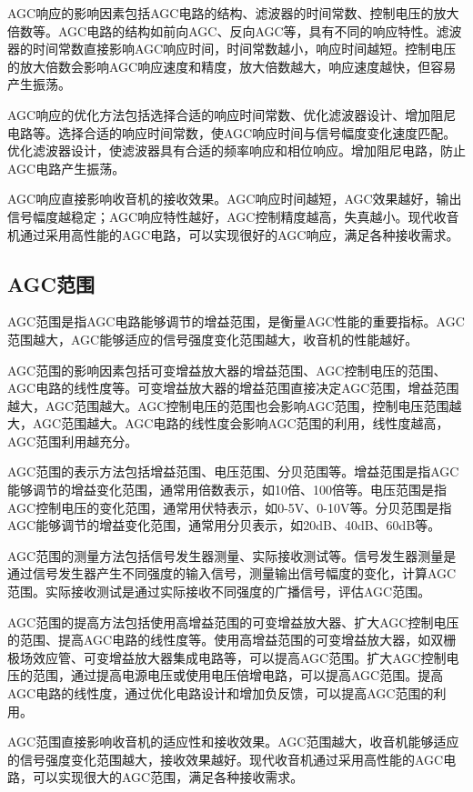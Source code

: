 \documentclass[12pt,UTF8]{ctexbook}
\begin{document}
AGC响应的影响因素包括AGC电路的结构、滤波器的时间常数、控制电压的放大倍数等。AGC电路的结构如前向AGC、反向AGC等，具有不同的响应特性。滤波器的时间常数直接影响AGC响应时间，时间常数越小，响应时间越短。控制电压的放大倍数会影响AGC响应速度和精度，放大倍数越大，响应速度越快，但容易产生振荡。

AGC响应的优化方法包括选择合适的响应时间常数、优化滤波器设计、增加阻尼电路等。选择合适的响应时间常数，使AGC响应时间与信号幅度变化速度匹配。优化滤波器设计，使滤波器具有合适的频率响应和相位响应。增加阻尼电路，防止AGC电路产生振荡。

AGC响应直接影响收音机的接收效果。AGC响应时间越短，AGC效果越好，输出信号幅度越稳定；AGC响应特性越好，AGC控制精度越高，失真越小。现代收音机通过采用高性能的AGC电路，可以实现很好的AGC响应，满足各种接收需求。

\subsection{AGC范围}

AGC范围是指AGC电路能够调节的增益范围，是衡量AGC性能的重要指标。AGC范围越大，AGC能够适应的信号强度变化范围越大，收音机的性能越好。

AGC范围的影响因素包括可变增益放大器的增益范围、AGC控制电压的范围、AGC电路的线性度等。可变增益放大器的增益范围直接决定AGC范围，增益范围越大，AGC范围越大。AGC控制电压的范围也会影响AGC范围，控制电压范围越大，AGC范围越大。AGC电路的线性度会影响AGC范围的利用，线性度越高，AGC范围利用越充分。

AGC范围的表示方法包括增益范围、电压范围、分贝范围等。增益范围是指AGC能够调节的增益变化范围，通常用倍数表示，如10倍、100倍等。电压范围是指AGC控制电压的变化范围，通常用伏特表示，如0-5V、0-10V等。分贝范围是指AGC能够调节的增益变化范围，通常用分贝表示，如20dB、40dB、60dB等。

AGC范围的测量方法包括信号发生器测量、实际接收测试等。信号发生器测量是通过信号发生器产生不同强度的输入信号，测量输出信号幅度的变化，计算AGC范围。实际接收测试是通过实际接收不同强度的广播信号，评估AGC范围。

AGC范围的提高方法包括使用高增益范围的可变增益放大器、扩大AGC控制电压的范围、提高AGC电路的线性度等。使用高增益范围的可变增益放大器，如双栅极场效应管、可变增益放大器集成电路等，可以提高AGC范围。扩大AGC控制电压的范围，通过提高电源电压或使用电压倍增电路，可以提高AGC范围。提高AGC电路的线性度，通过优化电路设计和增加负反馈，可以提高AGC范围的利用。

AGC范围直接影响收音机的适应性和接收效果。AGC范围越大，收音机能够适应的信号强度变化范围越大，接收效果越好。现代收音机通过采用高性能的AGC电路，可以实现很大的AGC范围，满足各种接收需求。
\end{document}

